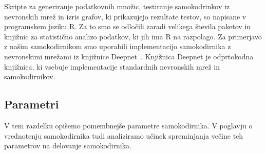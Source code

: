 \documentclass[12pt,a4paper,twoside]{article}
\theoremstyle{definition} %
\theoremstyle{plain} %
\numberwithin{equation}{section}  %
\begin{document}
Skripte za generiranje podatkovnih množic, testiranje samokodrinkov iz nevronskih mrež in izris grafov, ki prikazujejo rezultate testov, so napisane v programskem jeziku R.
Za to smo se odločili zaradi velikega števila paketov in knjižnic za statistično analizo podatkov, ki jih ima R na razpolago.
Za primerjavo z našim samokodirnikom smo uporabili implementacijo samokodirnika z nevronskimi mrežami iz knjižnice Deepnet~\cite{deepnet}.
Knjižnica Deepnet je odprtokodna knjižnica, ki vsebuje implementacije standardnih nevronskih mrež in samokodirnikov.


\subsection{Parametri}
\label{razdelek-parametri}

V tem razdelku opišemo pomembnejše parametre samokodirnika. 
V poglavju o vrednotenju samokodirnika tudi analiziramo učinek spreminjanja večine teh parametrov na delovanje samokodirnika.
\end{document}
